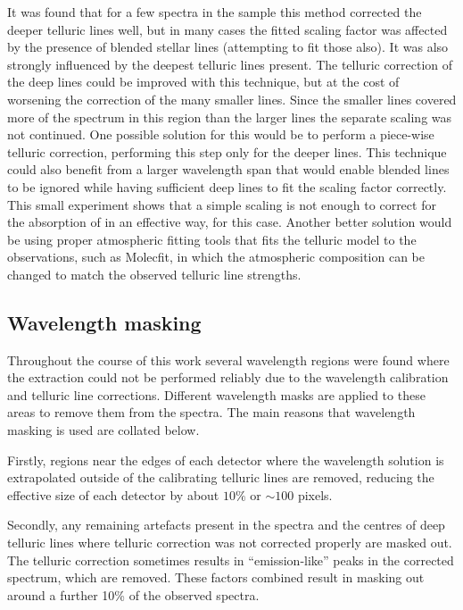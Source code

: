 It was found that for a few spectra in the sample this method corrected the deeper telluric lines well, but in many cases the fitted scaling factor was affected by the presence of blended stellar lines (attempting to fit those also).
It was also strongly influenced by the deepest  telluric lines present.
The telluric correction of the deep  lines could be improved with this technique, but at the cost of worsening the correction of the many smaller  lines.
Since the smaller  lines covered more of the spectrum in this region than the larger lines the separate  scaling was not continued.
One possible solution for this would be to perform a piece-wise telluric correction, performing this step only for the deeper  lines.
This technique could also benefit from a larger wavelength span that would enable blended lines to be ignored while having sufficient deep  lines to fit the scaling factor correctly.
This small experiment shows that a simple scaling is not enough to correct for the absorption of  in an effective way, for this case.
Another better solution would be using proper atmospheric fitting tools that fits the telluric model to the observations, such as {Molecfit}, in which the atmospheric composition can be changed to match the observed telluric line strengths.


\subsection{Wavelength masking}
Throughout the course of this work several wavelength regions were found where the extraction could not be performed reliably due to the wavelength calibration and telluric line corrections.
Different wavelength masks are applied to these areas to remove them from the spectra.
The main reasons that wavelength masking is used are collated below.

Firstly, regions near the edges of each detector where the wavelength solution is extrapolated outside of the calibrating telluric lines are removed, reducing the effective size of each detector by about \(10\%\) or \(\sim100\) pixels.

Secondly, any remaining artefacts present in the spectra and the centres of deep telluric lines where telluric correction was not corrected properly are masked out.
The telluric correction sometimes results in ``emission-like'' peaks in the corrected spectrum, which are removed.
These factors combined result in masking out around a further 10\% of the observed spectra.

